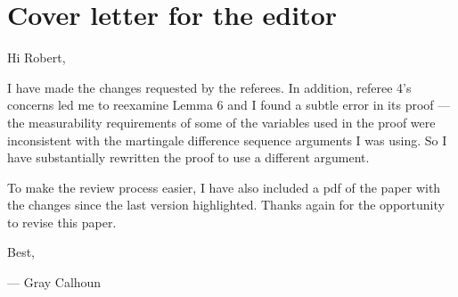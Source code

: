\documentclass[12pt]{article}
\begin{document}
\section*{\hfill Cover letter for the editor\hfill}

Hi Robert,

I have made the changes requested by the referees. In addition,
referee 4's concerns led me to reexamine Lemma 6 and I found a subtle
error in its proof --- the measurability requirements of some of the
variables used in the proof were inconsistent with the martingale
difference sequence arguments I was using. So I have substantially
rewritten the proof to use a different argument.

To make the review process easier, I have also included a pdf of the
paper with the changes since the last version highlighted. Thanks
again for the opportunity to revise this paper.

\strut

\noindent Best,

\strut

\noindent --- Gray Calhoun
\end{document}
